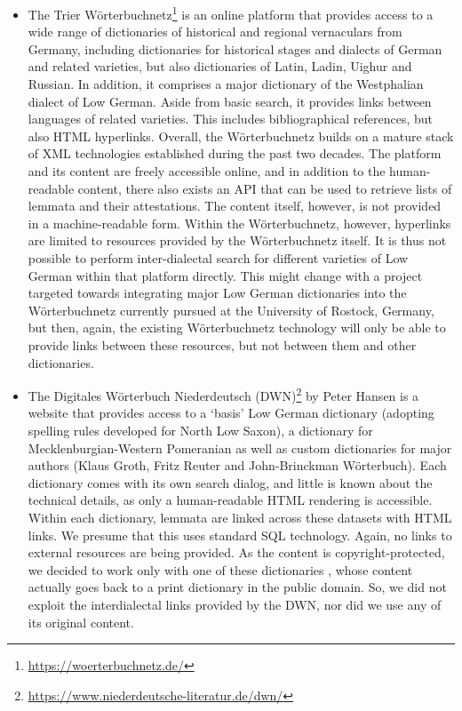 \documentclass[11pt]{article}
\begin{document}
\begin{itemize}
\item The Trier Wörterbuchnetz\footnote{\url{https://woerterbuchnetz.de/}} is an online platform that provides access to a wide range of dictionaries of historical and regional vernaculars from Germany, including dictionaries for historical stages and dialects of German and related varieties, but also dictionaries of Latin, Ladin, Uighur and Russian. In addition, it comprises a major dictionary of the Westphalian dialect of Low German. Aside from basic search, it provides links between languages of related varieties. This includes bibliographical references, but also HTML hyperlinks. Overall, the Wörterbuchnetz builds on a mature stack of XML technologies established during the past two decades. The platform and its content are freely accessible online, and in addition to the human-readable content, there also exists an API that can be used to retrieve lists of lemmata and their attestations. The content itself, however, is not provided in a machine-readable form. Within the Wörterbuchnetz, however, hyperlinks are limited to resources provided by the Wörterbuchnetz itself. It is thus not possible to perform inter-dialectal search for different varieties of Low German within that platform directly. This might change with a project targeted towards integrating major Low German dictionaries into the Wörterbuchnetz currently pursued at the University of Rostock, Germany, but then, again, the existing Wörterbuchnetz technology will only be able to provide links between these resources, but not between them and other dictionaries.
\item The Digitales Wörterbuch Niederdeutsch (DWN)\footnote{\url{https://www.niederdeutsche-literatur.de/dwn/}} by Peter Hansen is a website that provides access to a `basis' Low German dictionary (adopting spelling rules developed for North Low Saxon), a dictionary for Mecklenburgian-Western Pomeranian as well as custom dictionaries for major authors (Klaus Groth, Fritz Reuter and John-Brinckman Wörterbuch). Each dictionary comes with its own search dialog, and little is known about the technical details, as only a human-readable HTML rendering is accessible. Within each dictionary, lemmata are linked across these datasets with HTML links. We presume that this uses standard SQL technology. Again, no links to external resources are being provided.
As the content is copyright-protected, we decided to work only with one of these dictionaries \citep{muller1904reuter}, whose content actually goes back to a print dictionary in the public domain. So, we did not exploit the interdialectal links provided by the DWN, nor did we use any of its original content.

\end{itemize}
\end{document}

